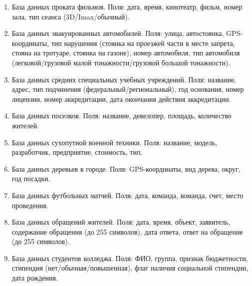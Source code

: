 \documentclass{article}
\begin{document}
\begin{enumerate}
	\item База данных проката фильмов. Поля: дата, время, кинотеатр, фильм, номер зала, тип сеанса (3D/Imax/обычный).
	\item База данных эвакуированных автомобилей. Поля: улица, автостоянка, GPS-координаты, 
тип нарушения (стоянка на проезжей части в месте запрета, стояна на тротуаре, стоянка на газоне), 
номер автомобиля, тип автомобиля (легковой/грузовой малой тонажности/грузовой большой
тонажности). 
	\item База данных средних специальных учебных учреждений. Поля: название, адрес, тип подчинения (федеральный/региональный), 
год основания, номер лицензии, номер аккредитации, дата окончания действия аккредитации. 
	\item База данных поселков. Поля: название, девелопер, площадь, количество жителей.
	\item База данных сухопутной военной техники. Поля: название, модель, разработчик, предприятие, стоимость, тип. 
	\item База данных деревьев в городе. Поля: GPS-координаты, вид дерева, округ, год посадки. 
	\item База данных футбольных матчей. Поля: дата, команда, команда, счет, место проведения. 
	\item База данных обращений жителей. Поля: дата, время, объект, заявитель, содержание обращения (до 255 символов), 
дата ответа, ответ на обращение (до 255 символов).
	\item База данных студентов колледжа. Поля: ФИО, группа, признак бюджетности, 
стипендия (нет/обычная/повышенная), флаг наличия социальной стипендии, дата рождения.
\end{enumerate}
\end{document}
